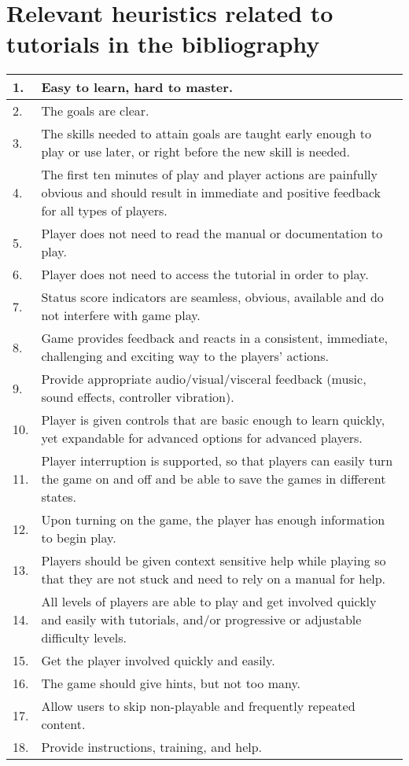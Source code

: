 \appendix
\chapter{Relevant heuristics related to tutorials in the bibliography}

\begin{center}
\begin{tabularx}{\textwidth}{|l|X|}
	\hline
	1. & Easy to learn, hard to master. \\ \hline
	2. & The goals are clear. \\ \hline	
	3. & The skills needed to attain goals are taught early enough to play or use later, or right before the new skill is needed. \\ \hline
	4. & The first ten minutes of play and player actions are painfully obvious and should result in immediate and positive feedback for all types of players. \\ \hline
	5. & Player does not need to read the manual or documentation to play. \\ \hline
	6. & Player does not need to access the tutorial in order to play. \\ \hline
	7. & Status score indicators are seamless, obvious, available and do not interfere with game play. \\ \hline
	8. & Game provides feedback and reacts in a consistent, immediate, challenging and exciting way to the players’ actions. \\ \hline
	9. & Provide appropriate audio/visual/visceral feedback (music, sound effects, controller vibration). \\ \hline
	10. & Player is given controls that are basic enough to learn quickly, yet expandable for advanced options for advanced players. \\ \hline
	11. & Player interruption is supported, so that players can easily turn the game on and off and be able to save the games in different states. \\ \hline
	12. & Upon turning on the game, the player has enough information to begin play. \\ \hline
	13. & Players should be given context sensitive help while playing so that they are not stuck and need to rely on a manual for help. \\ \hline
	14. & All levels of players are able to play and get involved quickly and easily with tutorials, and/or progressive or adjustable difficulty levels. \\ \hline
	15. & Get the player involved quickly and easily. \\ \hline
	16. & The game should give hints, but not too many. \\ \hline
	17. & Allow users to skip non-playable and frequently repeated content. \\ \hline
	18. & Provide instructions, training, and help. \\ \hline
\end{tabularx}
\end{center}

